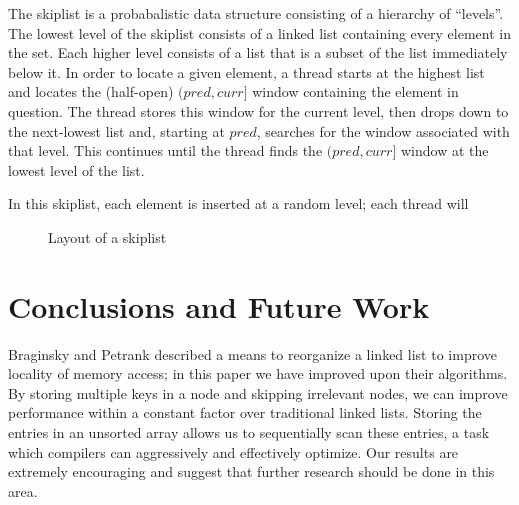 \documentclass{llncs}
\begin{document}
{The skiplist is a probabalistic data structure consisting of a hierarchy of ``levels''.  The lowest level of the skiplist consists of a linked list containing every element in the set.  Each higher level consists of a list that is a subset of the list immediately below it.  In order to locate a given element, a thread starts at the highest list and locates the (half-open) $(pred,curr]$ window containing the element in question.  The thread stores this window for the current level, then drops down to the next-lowest list and, starting at $pred$, searches for the window associated with that level.  This continues until the thread finds the $(pred,curr]$ window at the lowest level of the list.

In this skiplist, each element is inserted at a random level; each thread will  

\begin{figure}
\begin{center}
\end{center}
\caption{Layout of a skiplist}
\end{figure}
\section{Conclusions and Future Work}\label{Section:Conclusions}

Braginsky and Petrank described a means to reorganize a linked list to improve locality of memory
access; in this paper we have improved upon their algorithms.  By storing multiple keys in a node
and skipping irrelevant nodes, we can improve performance within a constant factor over traditional
linked lists.  Storing the entries
in an unsorted array allows us to sequentially scan these entries, a task which compilers can
aggressively and effectively optimize.  Our results are extremely encouraging and suggest that
further research should be done in this area.

}
\end{document}
